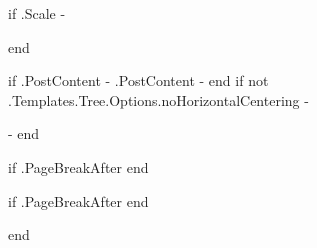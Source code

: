 \begin{center}
{
    {{ if .Scale -}}
    }
    {{ end }}

    {{ if .PostContent -}}
        {{ .PostContent }}
    {{- end }}
    {{ if not .Templates.Tree.Options.noHorizontalCentering -}}
    \end{center}
    {{- end }}


    {{ if .PageBreakAfter }}
        \vfill
    {{ end }}

    {{ if .PageBreakAfter }}
        \newpage
    {{ end }}

{{ end }}